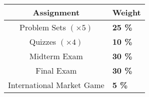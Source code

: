 \begin{table}[ht]
    \centering
    \begin{tabular}{c|l}
    \textbf{Assignment} & \textbf{Weight} \\
    \toprule
    Problem Sets $(\times 5)$  & \textbf{25 \%} \\
    Quizzes $(\times 4)$ & \textbf{10 \%} \\
    Midterm Exam  & \textbf{30 \%} \\
    Final Exam  & \textbf{30 \%} \\
    International Market Game  & \textbf{5 \%} \\
    \bottomrule
    \end{tabular}
    \label{Grade-Dist}
\end{table}